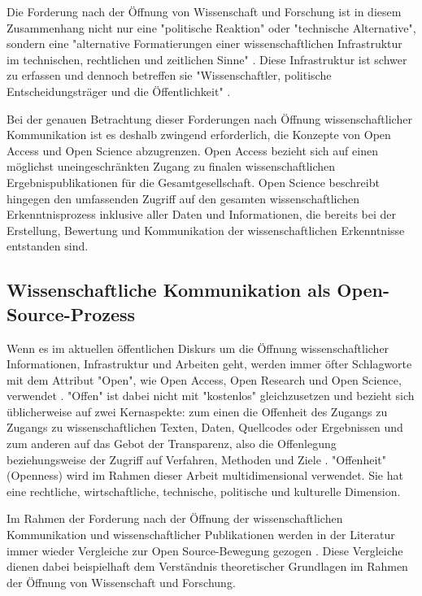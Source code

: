 Die Forderung nach der Öffnung von Wissenschaft und Forschung ist in diesem Zusammenhang nicht nur eine "politische Reaktion" oder "technische Alternative", sondern eine "alternative Formatierungen einer wissenschaftlichen Infrastruktur im technischen, rechtlichen und zeitlichen Sinne" \cite{Kelty_2004}. Diese Infrastruktur ist schwer zu erfassen \cite[:319]{Bowker_2000} und dennoch betreffen sie "Wissenschaftler, politische Entscheidungsträger und die Öffentlichkeit" \cite{Scheliga_2014}.

Bei der genauen Betrachtung dieser Forderungen nach Öffnung wissenschaftlicher Kommunikation ist es deshalb zwingend erforderlich, die Konzepte von Open Access und Open Science abzugrenzen. Open Access bezieht sich auf einen möglichst uneingeschränkten Zugang zu finalen wissenschaftlichen Ergebnispublikationen für die Gesamtgesellschaft. Open Science beschreibt hingegen den umfassenden Zugriff auf den gesamten wissenschaftlichen Erkenntnisprozess inklusive aller Daten und Informationen, die bereits bei der Erstellung, Bewertung und Kommunikation der wissenschaftlichen Erkenntnisse entstanden sind.

\subsection{Wissenschaftliche Kommunikation als Open-Source-Prozess}

Wenn es im aktuellen öffentlichen Diskurs um die Öffnung wissenschaftlicher Informationen, Infrastruktur und Arbeiten geht, werden immer öfter Schlagworte mit dem Attribut "Open", wie Open Access, Open Research und Open Science, verwendet \cite{Bunz_2014} \cite{Schulze_2013}. "Offen" ist dabei nicht mit "kostenlos" gleichzusetzen \cite{Grand_2012} und bezieht sich üblicherweise auf zwei Kernaspekte: zum einen die Offenheit des Zugangs zu Zugangs zu wissenschaftlichen Texten, Daten, Quellcodes oder Ergebnissen und zum anderen auf das Gebot der Transparenz, also die Offenlegung beziehungsweise der Zugriff auf Verfahren, Methoden und Ziele \cite{Schulze_2013}. "Offenheit" (Openness) wird im Rahmen dieser Arbeit multidimensional verwendet. Sie hat eine rechtliche, wirtschaftliche, technische, politische und kulturelle Dimension.

Im Rahmen der Forderung nach der Öffnung der wissenschaftlichen Kommunikation und wissenschaftlicher Publikationen werden in der Literatur immer wieder Vergleiche zur Open Source-Bewegung gezogen  \cite{Fecher_2013} \cite{Peters_2014} \cite{RIN_2010} \cite[:423]{Mantz_2007} \cite{Kittler_1999}. Diese Vergleiche dienen dabei beispielhaft dem Verständnis theoretischer Grundlagen im Rahmen der Öffnung von Wissenschaft und Forschung.

